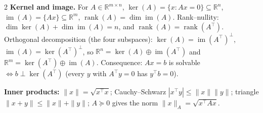 \documentclass{article}
\newcommand{\kw}[1]{\textbf{#1}}
\begin{document}
\begin{multicols}{2}
\kw{Kernel and image.} For $A\in\mathbb{R}^{m\times n}$, $\ker(A)=\{x:Ax=0\}\subseteq\mathbb{R}^n$, $\operatorname{im}(A)=\{Ax\}\subseteq\mathbb{R}^m$, $\operatorname{rank}(A)=\dim\operatorname{im}(A)$. Rank--nullity: $\dim\ker(A)+\dim\operatorname{im}(A)=n$, and $\operatorname{rank}(A)=\operatorname{rank}(A^\top)$. Orthogonal decomposition (the four subspaces): $\ker(A)=\operatorname{im}(A^\top)^\perp$, $\operatorname{im}(A)=\ker(A^\top)^\perp$, so $\mathbb{R}^n=\ker(A)\oplus\operatorname{im}(A^\top)$ and $\mathbb{R}^m=\ker(A^\top)\oplus\operatorname{im}(A)$. Consequence: $Ax=b$ is solvable $\Leftrightarrow b\perp\ker(A^\top)$ (every $y$ with $A^\top y=0$ has $y^\top b=0$).

\kw{Inner products:} $\|x\|=\sqrt{x^\top x}$; Cauchy--Schwarz $|x^\top y|\le\|x\|\|y\|$; triangle $\|x+y\|\le\|x\|+\|y\|$; $A\succeq 0$ gives the norm $\|x\|_A=\sqrt{x^\top Ax}$.

\end{multicols}
\end{document}
